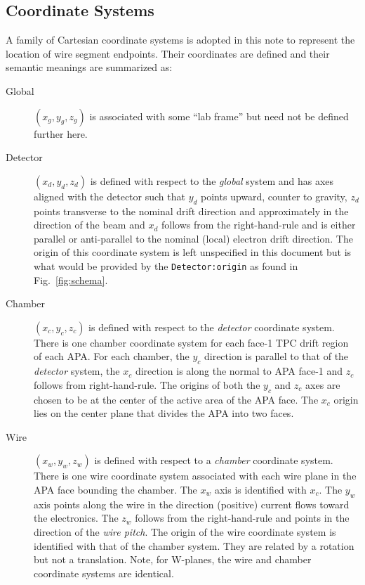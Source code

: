 \documentclass[pdftex,12pt,letter]{article}
\begin{document}
\subsection{Coordinate Systems}
\label{sec:coordsys}

A family of Cartesian coordinate systems is adopted in this note to
represent the location of wire segment endpoints.  Their coordinates
are defined and their semantic meanings are summarized as:

\begin{description}
\item[Global] $(x_g, y_g, z_g)$ is associated with some ``lab frame''
  but need not be defined further here.
\item[Detector] $(x_d, y_d, z_d)$ is defined with respect to the
  \textit{global} system and has axes aligned with the detector such
  that $y_d$ points upward, counter to gravity, $z_d$ points
  transverse to the nominal drift direction and approximately in the
  direction of the beam and $x_d$ follows from the right-hand-rule and
  is either parallel or anti-parallel to the nominal (local) electron
  drift direction.  The origin of this coordinate system is left
  unspecified in this document but is what would be provided by the
  \texttt{Detector:origin} as found in 
  Fig.~\ref{fig:schema}.
\item[Chamber] $(x_c, y_c, z_c)$ is defined with respect to the
  \textit{detector} coordinate system.  There is one chamber
  coordinate system for each face-1 TPC drift region of each APA.  For
  each chamber, the $y_c$ direction is parallel to that of the
  \textit{detector} system, the $x_c$ direction is along the normal to
  APA face-1 and $z_c$ follows from right-hand-rule.  The origins of
  both the $y_c$ and $z_c$ axes are chosen to be at the center of the
  active area of the APA face.  The $x_c$ origin lies on the center
  plane that divides the APA into two faces.  
\item[Wire] $(x_w, y_w, z_w)$ is defined with respect to a
  \textit{chamber} coordinate system.  There is one wire coordinate
  system associated with each wire plane in the APA face bounding the
  chamber.  The $x_w$ axis is identified with $x_c$.  The $y_w$ axis
  points along the wire in the direction (positive) current flows
  toward the electronics.  The $z_w$ follows from the right-hand-rule
  and points in the direction of the \textit{wire pitch}.  The origin
  of the wire coordinate system is identified with that of the chamber
  system.  They are related by a rotation but not a
  translation.  Note, for W-planes, the wire and chamber coordinate
  systems are identical.
\end{description}
\end{document}
